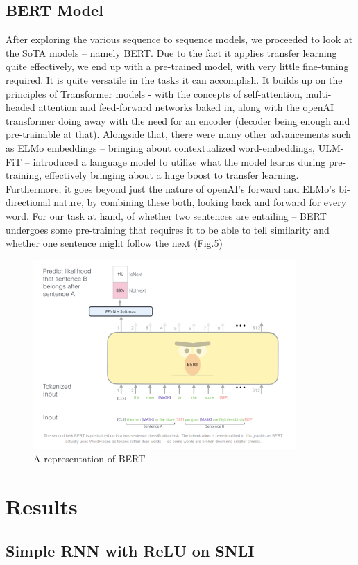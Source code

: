 \documentclass[12pt, conference]{IEEEtran}
\begin{document}
\subsection{BERT Model}
After exploring the various sequence to sequence models, we proceeded to look at the SoTA models – namely BERT. Due to the fact it applies transfer learning quite effectively, we end up with a pre-trained model, with very little fine-tuning required. It is quite versatile in the tasks it can accomplish.
It builds up on the principles of Transformer models - with the concepts of self-attention, multi-headed attention and feed-forward networks baked in, along with the openAI transformer doing away with the need for an encoder (decoder being enough and pre-trainable at that). Alongside that, there were many other advancements such as ELMo embeddings – bringing about contextualized word-embeddings, ULM-FiT – introduced a language model to utilize what the model learns during pre-training, effectively bringing about a huge boost to transfer learning.
Furthermore, it goes beyond just the nature of openAI’s forward and ELMo’s bi-directional nature, by combining these both, looking back and forward for every word.
For our task at hand, of whether two sentences are entailing – BERT undergoes some pre-training that requires it to be able to tell similarity and whether one sentence might follow the next (Fig.5)
\begin{figure}[h]
\centering
\includegraphics[width=10cm]{images/bert.png}
\caption{A representation of BERT}
\end{figure}

\section{Results}

\subsection{Simple RNN with ReLU on SNLI}
\end{document}
